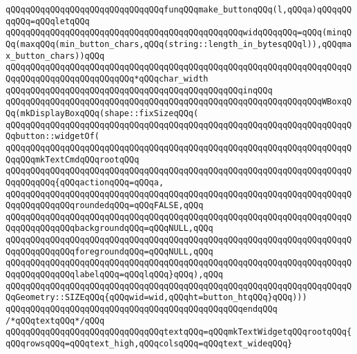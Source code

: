 \newline
\verb|qQQqqQQqqQQqqQQqqQQqqQQqqQQqqQQqfunqQQqmake_buttonqQQq(l,qQQqa)qQQqqQQqqQQq=qQQqletqQQq|\newline
\verb|qQQqqQQqqQQqqQQqqQQqqQQqqQQqqQQqqQQqqQQqqQQqqQQqwidqQQqqQQq=qQQq(minqQQq(maxqQQq(min_button_chars,qQQq(string::length_in_bytesqQQql)),qQQqmax_button_chars))qQQq|\newline
\verb|qQQqqQQqqQQqqQQqqQQqqQQqqQQqqQQqqQQqqQQqqQQqqQQqqQQqqQQqqQQqqQQqqQQqqQQqqQQqqQQqqQQqqQQqqQQqqQQq*qQQqchar_width|\newline
\verb|qQQqqQQqqQQqqQQqqQQqqQQqqQQqqQQqqQQqqQQqqQQqqQQqinqQQq|\newline
\verb|qQQqqQQqqQQqqQQqqQQqqQQqqQQqqQQqqQQqqQQqqQQqqQQqqQQqqQQqqQQqqQQqWBoxqQQq(mkDisplayBoxqQQq(shape::fixSizeqQQq(|\newline
\verb|qQQqqQQqqQQqqQQqqQQqqQQqqQQqqQQqqQQqqQQqqQQqqQQqqQQqqQQqqQQqqQQqqQQqqQQqbutton::widgetOf(|\newline
\verb|qQQqqQQqqQQqqQQqqQQqqQQqqQQqqQQqqQQqqQQqqQQqqQQqqQQqqQQqqQQqqQQqqQQqqQQqqQQqmkTextCmdqQQqrootqQQq|\newline
\verb|qQQqqQQqqQQqqQQqqQQqqQQqqQQqqQQqqQQqqQQqqQQqqQQqqQQqqQQqqQQqqQQqqQQqqQQqqQQqqQQq{qQQqactionqQQq=qQQqa,|\newline
\verb|qQQqqQQqqQQqqQQqqQQqqQQqqQQqqQQqqQQqqQQqqQQqqQQqqQQqqQQqqQQqqQQqqQQqqQQqqQQqqQQqqQQqroundedqQQq=qQQqFALSE,qQQq|\newline
\verb|qQQqqQQqqQQqqQQqqQQqqQQqqQQqqQQqqQQqqQQqqQQqqQQqqQQqqQQqqQQqqQQqqQQqqQQqqQQqqQQqqQQqbackgroundqQQq=qQQqNULL,qQQq|\newline
\verb|qQQqqQQqqQQqqQQqqQQqqQQqqQQqqQQqqQQqqQQqqQQqqQQqqQQqqQQqqQQqqQQqqQQqqQQqqQQqqQQqqQQqforegroundqQQq=qQQqNULL,qQQq|\newline
\verb|qQQqqQQqqQQqqQQqqQQqqQQqqQQqqQQqqQQqqQQqqQQqqQQqqQQqqQQqqQQqqQQqqQQqqQQqqQQqqQQqqQQqlabelqQQq=qQQqlqQQq}qQQq),qQQq|\newline
\verb|qQQqqQQqqQQqqQQqqQQqqQQqqQQqqQQqqQQqqQQqqQQqqQQqqQQqqQQqqQQqqQQqqQQqqQQqGeometry::SIZEqQQq{qQQqwid=wid,qQQqht=button_htqQQq}qQQq)))|\newline
\verb|qQQqqQQqqQQqqQQqqQQqqQQqqQQqqQQqqQQqqQQqqQQqqQQqendqQQq|\newline
\newline
\verb|/*qQQqtextqQQq*/qQQq|\newline
\verb|qQQqqQQqqQQqqQQqqQQqqQQqqQQqqQQqtextqQQq=qQQqmkTextWidgetqQQqrootqQQq{qQQqrowsqQQq=qQQqtext_high,qQQqcolsqQQq=qQQqtext_wideqQQq}|\newline
\newline
